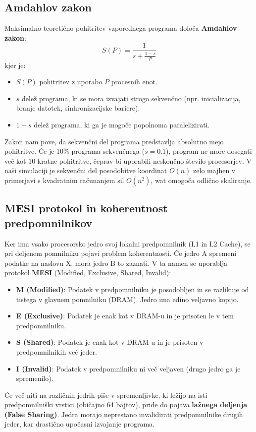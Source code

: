 \documentclass[11pt,a4paper]{article}
\begin{document}
\subsection{Amdahlov zakon}
Maksimalno teoreti\v{c}no pohitritev vzporednega programa dolo\v{c}a \textbf{Amdahlov zakon}:
\begin{equation}
    S(P) = \frac{1}{s + \frac{1 - s}{P}}
\end{equation}
kjer je:
\begin{itemize}
    \item $S(P)$ pohitritev z uporabo $P$ procesnih enot.
    \item $s$ dele\v{z} programa, ki se mora izvajati strogo sekven\v{c}no (npr. inicializacija, branje datotek, sinhronizacijske bariere).
    \item $1 - s$ dele\v{z} programa, ki ga je mogo\v{c}e popolnoma paralelizirati.
\end{itemize}
Zakon nam pove, da sekven\v{c}ni del programa predstavlja absolutno mejo pohitritve. \v{C}e je $10\%$ programa sekven\v{c}nega ($s = 0.1$), program ne more dosegati več kot $10$-kratne pohitritve, \v{c}eprav bi uporabili neskon\v{c}no \v{s}tevilo procesorjev. V na\v{s}i simulaciji je sekven\v{c}ni del posodobitve koordinat $O(n)$ zelo majhen v primerjavi s kvadratnim računanjem sil $O(n^2)$, wat omogo\v{c}a odlično skaliranje.

\subsection{MESI protokol in koherentnost predpomnilnikov}
Ker ima vsako procesorsko jedro svoj lokalni predpomnilnik (L1 in L2 Cache), se pri deljenem pomnilniku pojavi problem koherentnosti. \v{C}e jedro A spremeni podatke na naslovu X, mora jedro B to zaznati. V ta namen se uporablja protokol \textbf{MESI} (Modified, Exclusive, Shared, Invalid):
\begin{itemize}
    \item \textbf{M (Modified)}: Podatek v predpomnilniku je posodobljen in se razlikuje od tistega v glavnem pomnilniku (DRAM). Jedro ima edino veljavno kopijo.
    \item \textbf{E (Exclusive)}: Podatek je enak kot v DRAM-u in je prisoten le v tem predpomnilniku.
    \item \textbf{S (Shared)}: Podatek je enak kot v DRAM-u in je prisoten v predpomnilnikih več jeder.
    \item \textbf{I (Invalid)}: Podatek v predpomnilniku ni več veljaven (drugo jedro ga je spremenilo).
\end{itemize}
\v{C}e več niti na različnih jedrih pi\v{s}e v spremenljivke, ki ležijo na isti predpomnilni\v{s}ki vrstici (običajno 64 bajtov), pride do pojava \textbf{lažnega deljenja (False Sharing)}. Jedra morajo neprestano invalidirati predpomnilnike drugih jeder, kar drastično upo\v{c}asni izvajanje programa.
\end{document}
